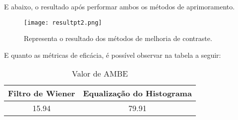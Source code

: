 \documentclass[conference]{IEEEtran}
\begin{document}
E abaixo, o resultado após performar ambos os métodos de aprimoramento.

\begin{figure}[H]
    \centering
    \texttt{[image: resultpt2.png]}
    \caption{Representa o resultado dos métodos de melhoria de contraste.}
    \label{fig:label2}
\end{figure}

E quanto as métricas de eficácia, é possível observar na tabela a seguir:

\begin{table}[H]
\renewcommand{\arraystretch}{1.3}
\caption{Valor de AMBE}
\label{table_example}
\centering
\begin{tabular}{c||c}
\hline
\bfseries Filtro de Wiener &
\bfseries Equalização do Histograma \\
\hline\hline
15.94 & 79.91 \\
\hline
\end{tabular}
\end{table}
\end{document}
